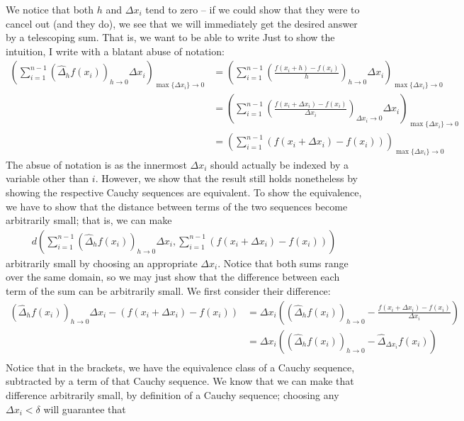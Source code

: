 \documentclass{article}
\theoremstyle{definition}
\begin{document}
We notice that both $h$ and $\Delta x_i$ tend to zero -- if we could show that they were to cancel out (and they do), we see that we will immediately get the desired answer by a telescoping sum. That is, we want to be able to write
Just to show the intuition, I write with a blatant abuse of notation:
\begin{align*}
	\left(\sum_{i=1}^{n-1}\left(\hat\Delta_h f(x_i)\right)_{h\rightarrow0}\Delta x_i\right)_{\max\{\Delta x_i\}\rightarrow0}&=\left(\sum_{i=1}^{n-1}\left(\frac{f(x_i+h)-f(x_i)}{h}\right)_{h\rightarrow0}\Delta x_i\right)_{\max\{\Delta x_i\}\rightarrow0}\\
	&=\left(\sum_{i=1}^{n-1}\left(\frac{f(x_i+\Delta x_i)-f(x_i)}{\Delta x_i}\right)_{\Delta x_i\rightarrow0}\Delta x_i\right)_{\max\{\Delta x_i\}\rightarrow0}\\
	&=\left(\sum_{i=1}^{n-1}(f(x_i+\Delta x_i)-f(x_i))\right)_{\max\{\Delta x_i\}\rightarrow0}
\end{align*}
The absue of notation is as the innermost $\Delta x_i$ should actually be indexed by a variable other than $i$. However, we show that the result still holds nonetheless by showing the respective Cauchy sequences are equivalent. To show the equivalence, we have to show that the distance between terms of the two sequences become arbitrarily small; that is, we can make
\begin{align*}
	d\left(\sum_{i=1}^{n-1}\left(\hat\Delta_h f(x_i)\right)_{h\rightarrow0}\Delta x_i,\sum_{i=1}^{n-1}(f(x_i+\Delta x_i)-f(x_i))\right)
\end{align*}
arbitrarily small by choosing an appropriate $\Delta x_i$. Notice that both sums range over the same domain, so we may just show that the difference between each term of the sum can be arbitrarily small. We first consider their difference:
\begin{align*}
	\left(\hat\Delta_h f(x_i)\right)_{h\rightarrow0}\Delta x_i-(f(x_i+\Delta x_i)-f(x_i))&=\Delta x_i\left(\left(\hat\Delta_h f(x_i)\right)_{h\rightarrow0}-\frac{f(x_i+\Delta x_i)-f(x_i)}{\Delta x_i}\right)\\
	&=\Delta x_i\left(\left(\hat\Delta_h f(x_i)\right)_{h\rightarrow0}-\hat\Delta_{\Delta x_i} f(x_i)\right)\\
\end{align*}
Notice that in the brackets, we have the equivalence class of a Cauchy sequence, subtracted by a term of that Cauchy sequence. We know that we can make that difference arbitrarily small, by definition of a Cauchy sequence; choosing any $\Delta x_i<\delta$ will guarantee that 
\end{document}
